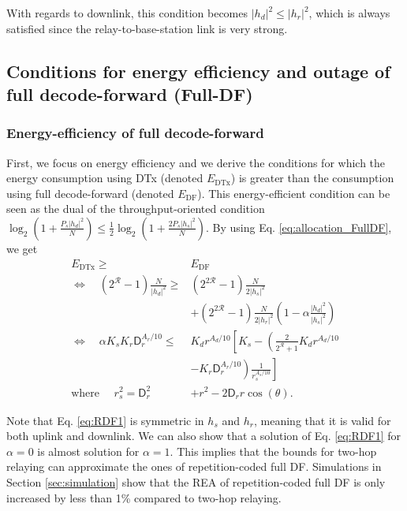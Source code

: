 \documentclass[journal]{IEEEtran}
\theoremstyle{definition}
\begin{document}
With regards to downlink, this condition becomes $\vert h_d \vert^2 \leq \vert h_r \vert^2$, which is always satisfied since the relay-to-base-station link is very strong.



\subsection{Conditions for energy efficiency and outage of full decode-forward (Full-DF)}

\subsubsection{Energy-efficiency of full decode-forward}
\label{sec:EE_Full_DF}

First, we focus on energy efficiency and we derive the conditions for which the energy consumption using DTx (denoted $E_{\text{DTx}}$) is greater than the consumption using full decode-forward (denoted $E_{\text{DF}}$). This energy-efficient condition can be seen as the dual of the throughput-oriented condition $\log_2 \left(1 + \frac{P_s \vert h_d \vert^2}{N}\right) \leq \frac{1}{2}\log_2 \left(1 + \frac{2 P_s \vert h_s \vert^2}{N}\right)$.  By using Eq. \eqref{eq:allocation_FullDF}, we get
\begin{align}
E_{\text{DTx}} \geq & E_{\text{DF}} \label{eq:RDF1}
\\ \nonumber \Leftrightarrow \quad
\left( 2^{\mathcal{R}}-1 \right) \frac{N}{\vert h_d \vert^2} \geq &
\left( 2^{2\mathcal{R}}-1 \right) \frac{N}{2\vert h_s \vert^2} 
\\ \nonumber &
+ \left( 2^{2\mathcal{R}}-1 \right) \frac{N}{2\vert h_r \vert^2} \left(1 - \alpha \frac{\vert h_d \vert^2}{\vert h_s \vert^2} \right)
\\ \nonumber \Leftrightarrow \quad 
\alpha K_s K_r \mathsf{D}_r^{A_r/10} \leq &
K_d r^{A_d/10} \left[ K_s - \left(\frac{2}{2^{\mathcal{R}}+1} K_d r^{A_d/10} 
\right. \right. \\ \nonumber  & \left. \left.
- K_r \mathsf{D}_r^{A_r/10} \right)\frac{1}{r_s^{A_s/10}}\right] 
\\ \text{where } \quad r_s^2  = \mathsf{D}_r^2 & + r^2 - 2 \mathsf{D}_r r \cos(\theta) . \nonumber
\end{align}

Note that Eq. \eqref{eq:RDF1} is symmetric in $h_s$ and $h_r$, meaning that it is valid for both uplink and downlink.
We can also show that a solution of Eq. \eqref{eq:RDF1} for $\alpha = 0$ is almost solution for $\alpha = 1$.
This implies that the bounds for two-hop relaying can approximate the ones of repetition-coded full DF. Simulations in Section \ref{sec:simulation} show that the REA of repetition-coded full DF is only increased by less than 1\% compared to two-hop relaying.
\end{document}
